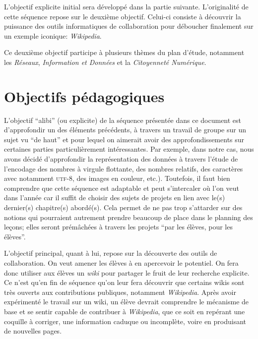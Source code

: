 \documentclass[11pt,bibliography=totoc]{scrartcl}
\begin{document}
L'objectif explicite initial sera développé dans la partie
suivante. L'originalité de cette séquence repose sur le deuxième
objectif. Celui-ci consiste à découvrir la puissance des outils informatiques de
collaboration pour déboucher finalement sur un exemple iconique:
\textit{Wikipedia}.

Ce deuxième objectif participe à plusieurs thèmes du plan d'étude, notamment les
\textit{Réseaux}, \textit{Information et Données} et la \textit{Citoyenneté
  Numérique}.

\section{Objectifs pédagogiques}
L'objectif ``alibi'' (ou explicite) de la séquence présentée dans ce document
est d'approfondir un des éléments précédents, à travers un travail de groupe sur
un sujet vu ``de haut'' et pour lequel on aimerait avoir des approfondissements
sur certaines parties particulièrement intéressantes.  Par exemple, dans notre
cas, nous avons décidé d'approfondir la représentation des données à travers
l'étude de l'encodage des nombres à virgule flottante, des nombres relatifs, des
caractères avec notamment \textsc{utf}-8, des images en couleur, etc.).
Toutefois, il faut bien comprendre que cette séquence est adaptable et peut
s'intercaler où l'on veut dans l'année car il suffit de choisir des sujets de
projets en lien avec le(s) dernier(s) chapitre(s) abordé(s). Cela permet de ne
pas trop s'attarder sur des notions qui pourraient autrement prendre beaucoup de
place dans le planning des leçons; elles seront prémâchées à travers les projets
``par les élèves, pour les élèves''.

L'objectif principal, quant à lui, repose sur la découverte des outils de
collaboration. On veut amener les élèves à en apercevoir le potentiel.  On fera
donc utiliser aux élèves un \textit{wiki} pour partager le fruit de leur
recherche explicite.  Ce n'est qu'en fin de séquence qu'on leur fera découvrir
que certains wikis sont très ouverts aux contributions publiques, notamment
\textit{Wikipedia}.  Après avoir expérimenté le travail sur un wiki, un élève
devrait comprendre le mécanisme de base et se sentir capable de contribuer à
\textit{Wikipedia}, que ce soit en repérant une coquille à corriger, une
information caduque ou incomplète, voire en produisant de nouvelles pages.
\end{document}
